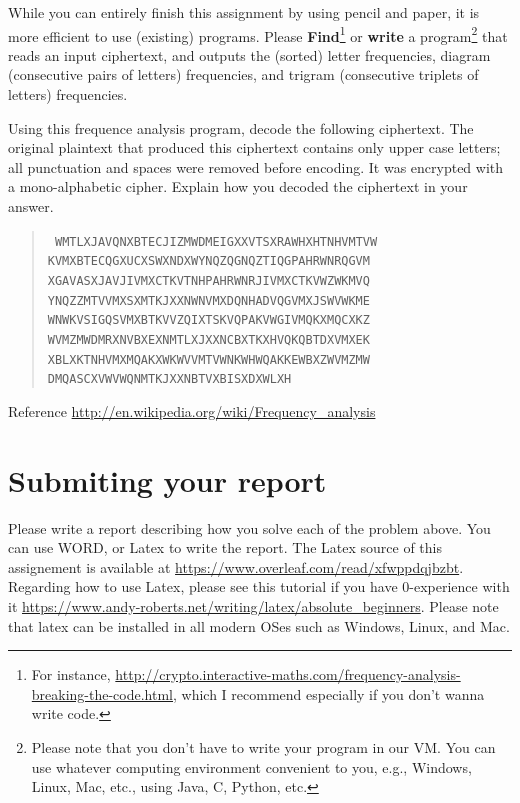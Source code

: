 \documentclass[11pt]{article}
\begin{document}
While you can entirely finish this assignment by using pencil and paper, it is more efficient to use (existing) programs. Please \textbf{Find}\footnote{For instance, \url{http://crypto.interactive-maths.com/frequency-analysis-breaking-the-code.html}, which I recommend especially if you don't wanna write code.} or \textbf{write} a program\footnote{Please note that you don't have to write your program in our VM. You can use whatever computing environment convenient to you, e.g., Windows, Linux, Mac, etc., using Java, C, Python, etc.} that reads an input ciphertext, and outputs the (sorted) letter frequencies, diagram (consecutive pairs of letters) frequencies, and trigram (consecutive triplets of letters) frequencies. 

Using this frequence analysis program, decode the following ciphertext. The original plaintext that produced this ciphertext contains only upper case letters;  all punctuation and spaces were removed before encoding.  It was encrypted with a mono-alphabetic cipher.  Explain how you decoded the ciphertext in your answer.

\begin{quote}
\raggedright{
{\tt
WMTLXJAVQNXBTECJIZMWDMEIGXXVTSXRAWHXHTNHVMTVW
KVMXBTECQGXUCXSWXNDXWYNQZQGNQZTIQGPAHRWNRQGVM
XGAVASXJAVJIVMXCTKVTNHPAHRWNRJIVMXCTKVWZWKMVQ
YNQZZMTVVMXSXMTKJXXNWNVMXDQNHADVQGVMXJSWVWKME
WNWKVSIGQSVMXBTKVVZQIXTSKVQPAKVWGIVMQKXMQCXKZ
WVMZMWDMRXNVBXEXNMTLXJXXNCBXTKXHVQKQBTDXVMXEK
XBLXKTNHVMXMQAKXWKWVVMTVWNKWHWQAKKEWBXZWVMZMW
DMQASCXVWVWQNMTKJXXNBTVXBISXDXWLXH
}
}
\end{quote}

\vspace{0.5in}
Reference \url{http://en.wikipedia.org/wiki/Frequency_analysis}
\vspace{0.5in}


\section{Submiting your report}
Please write a report describing how you solve each of the problem above. You can use WORD, or Latex to write the report. The Latex source of this assignement is available at \url{https://www.overleaf.com/read/xfwppdqjbzbt}. Regarding how to use Latex, please see this tutorial if you have 0-experience with it \url{https://www.andy-roberts.net/writing/latex/absolute_beginners}. Please note that latex can be installed in all modern OSes such as Windows, Linux, and Mac.
\end{document}
